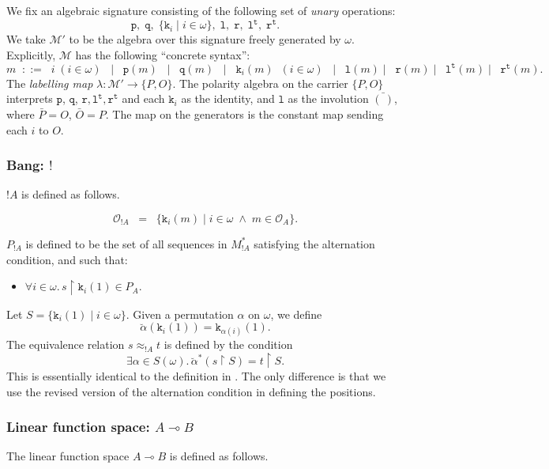 \documentclass[a4paper,11pt]{article}
\newcommand{\gequiv}{\approx}
\newcommand{\restrict}{{\upharpoonright}}
\newcommand{\Occ}{\mathcal{O}}
\newcommand{\al}{\mathtt{p}}
\newcommand{\ar}{\mathtt{q}}
\newcommand{\fr}{\mathtt{r}}
\newcommand{\MM}{\mathcal{M}}
\newcommand{\bangindex}[1]{\mathtt{k}_{#1}}
\newcommand{\linearfl}{\mathtt{l}}
\newcommand{\tensorfl}{\mathtt{l^t}}
\newcommand{\tensorfr}{\mathtt{r^t}}
\newcommand{\linimpl}{\multimap}
\newcommand{\linearMM}{\mathcal{M'}}
\begin{document}
We fix an algebraic signature consisting of the following set of
\emph{unary} operations:
\[ \al , \; \ar , \; \{ \bangindex{i} \mid i \in \omega \} , \; \linearfl, \; \fr, \; \tensorfl, \; \tensorfr. \]
We take $\linearMM$ to be the algebra over this signature freely
generated by $\omega$. Explicitly, $\MM$ has the following
``concrete syntax'':
\[
m \;\; ::= \;\; i \; (i \in \omega ) \;\; \mid \;\; \al (m) \;\; \mid
\;\; \ar (m) \;\; \mid \;\; \bangindex{i} (m) \;\; (i \in \omega )
\;\; \mid \;\; \linearfl (m) \mid \;\; \fr (m) \mid
\;\;
  \tensorfl (m)\mid \;\; \tensorfr (m).
\]
The \emph{labelling map} $\lambda : \linearMM \longrightarrow \{
P, O \}$. The polarity algebra on the carrier $\{ P, O \}$
interprets $\al$, $\ar$, $\fr,\tensorfl,\tensorfr$ and each
$\bangindex{i}$ as the identity, and $\linearfl$ as the involution
$\bar{(\ )}$, where $\bar{P} = O$, $\bar{O} = P$. The map on the
generators is the constant map sending each $i$ to $O$.

\subsubsection*{Bang: $!$ }
$!A$ is defined as follows.

\[ \Occ_{!A } \;\; = \;\; \{ \bangindex{i}(m) \mid i \in \omega
\; \wedge \; m \in \Occ_A \} .  \]

\noindent $P_{!A }$ is defined to be the set of all sequences in
$M_{!A}^{\ast}$ satisfying the alternation condition, and such
that:
\begin{itemize}
\item $\forall i \in \omega . \, s \restrict \bangindex{i}(1) \in P_A$.
\end{itemize}
Let $S = \{ \bangindex{i}(1) \mid i \in \omega \} $. Given a
permutation $\alpha$ on $\omega$, we define
\[ \breve{\alpha}(\bangindex{i}(1)) = \bangindex{\alpha (i)}(1). \]
The equivalence relation $s \gequiv_{!A} t$ is
defined by the condition
\[ \exists \alpha \in S(\omega ) . \,
\breve{\alpha}^{\ast}(s \restrict S) = t \restrict S .
\]
This is essentially identical to the definition in \cite{AJM00}.
The only difference is that we use the revised version of the
alternation condition in defining the positions.

\subsubsection*{Linear function space: $A \linimpl B$}
The linear function space $A \multimap B$ is defined as follows.
\end{document}
